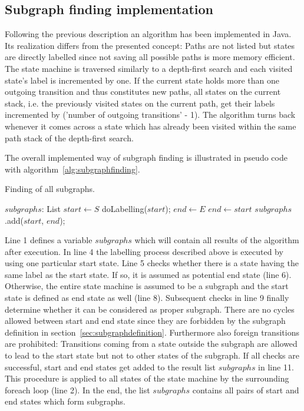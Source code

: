 \subsection{Subgraph finding implementation}
\label{sec:subgraphfindingimplementation}

Following the previous description an algorithm has been implemented in Java. Its realization differs from the presented concept: Paths are not listed but states are directly labelled since not saving all possible paths is more memory efficient.
The state machine is traversed similarly to a depth-first search and each visited state's label is incremented by one. If the current state holds more than one outgoing transition and thus constitutes new paths,  all states on the current stack, i.e. the previously visited states on the current path, get their labels incremented by ('number of outgoing transitions' - 1). The algorithm turns back whenever it comes across a state which has already been visited within the same path stack of the depth-first search.

The overall implemented way of subgraph finding is illustrated in pseudo code with algorithm~\ref{alg:subgraphfinding}.
\begin{algorithm}
\caption{Finding of all subgraphs.}
\label{alg:subgraphfinding}
\begin{algorithmic}[1]
\STATE $subgraphs$: List
  \STATE $start \leftarrow S$
	\STATE doLabelling($start$);
		\STATE $end \leftarrow E$
	\ELSE
		\STATE $end \leftarrow start$
	\ENDIF
		\STATE $subgraphs$.add($start$, $end$);
	\ENDIF
\ENDFOR
\end{algorithmic}
\end{algorithm}
Line 1 defines a variable $subgraphs$ which will contain all results of the algorithm after execution.
In line 4 the labelling process described above is executed by using one particular start state. Line 5 checks whether there is a state having the same label as the start state. If so, it is assumed as potential end state (line 6). Otherwise, the entire state machine is assumed to be a subgraph and the start state is defined as end state as well (line 8). Subsequent checks in line 9 finally determine whether it can be considered as proper subgraph.
There are no cycles allowed between start and end state since they are forbidden by the subgraph definition in section~\ref{sec:subgraphdefinition}.
Furthermore also foreign transitions are prohibited: Transitions coming from a state outside the subgraph are allowed to lead to the start state but not to other states of the subgraph. If all checks are successful, start and end states get added to the result list $subgraphs$ in line 11. This procedure is applied to all states of the state machine by the surrounding foreach loop (line 2). In the end, the list $subgraphs$ contains all pairs of start and end states which form subgraphs.


